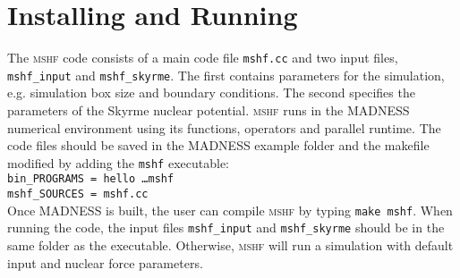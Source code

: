 \documentclass[4p]{elsarticle}
\begin{document}
\section{Installing and Running}
The \textsc{mshf} code consists of a main code file \texttt{mshf.cc} and two input files, \texttt{mshf\_input} and \texttt{mshf\_skyrme}. The first contains parameters for the simulation, e.g. simulation box size and boundary conditions. The second specifies the parameters of the Skyrme nuclear potential. \textsc{mshf} runs in the \textsc{MADNESS} numerical environment using its functions, operators and parallel runtime. The code files should be saved in the \textsc{MADNESS} example folder and the makefile modified by adding the \texttt{mshf} executable:\\
\texttt{bin\_PROGRAMS = hello \dots mshf}\\
\texttt{mshf\_SOURCES = mshf.cc}\\
Once \textsc{MADNESS} is built, the user can compile \textsc{mshf} by typing \texttt{make mshf}. When running the code, the input files \texttt{mshf\_input} and \texttt{mshf\_skyrme} should be in the same folder as the executable. Otherwise, \textsc{mshf} will run a simulation with default input and nuclear force parameters.
\end{document}
